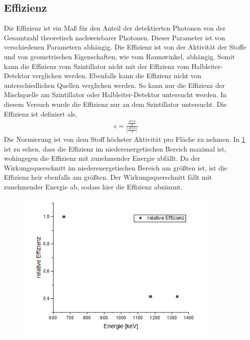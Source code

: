 \subsection{Effizienz}
Die Effizienz ist ein Maß für den Anteil der detektierten Photonen von der Gesamtzahl theoretisch nachweisbarer Photonen. Dieser Parameter ist von verschiedenen Parametern abhängig. Die Effizienz ist von der Aktivität der Stoffe und von geometrischen Eigenschaften, wie vom Raumwinkel, abhängig. Somit kann die Effizienz vom Szintillator nicht mit der Effizienz vom Halbleiter-Detektor verglichen werden. Ebenfalls kann die Effizienz nicht von unterschiedlichen Quellen verglichen werden. So kann nur die Effizienz der Mischquelle am Szintillator oder Halbleiter-Detektor untersucht werden. In diesem Versuch wurde die Effizienz nur an dem Szintillator untersucht. Die Effizienz ist definiert als, 
\begin{align}
	\epsilon = \frac{\frac{Area}{A}}{|\frac{Area}{A}|}
\end{align}
Die Normierung ist von dem Stoff höchster Aktivität pro Fläche zu nehmen.
In \cref{eff} ist zu sehen, dass die Effizienz im niederenergetischen Bereich maximal ist, wohingegen die Effizienz mit zunehmender Energie abfällt. Da der Wirkungsquerschnitt im niederenergetischen Bereich am größten ist, ist die Effizienz heir ebenfalls am größten. Der Wirkungsquerschnitt fällt mit zunehmender Energie ab, sodass hier die Effizienz abnimmt.
\begin{figure}[h!]
	\centering
	\includegraphics[width=0.9\textwidth]{Effizienz.png}
	\caption{}
	\label{eff}
\end{figure}

